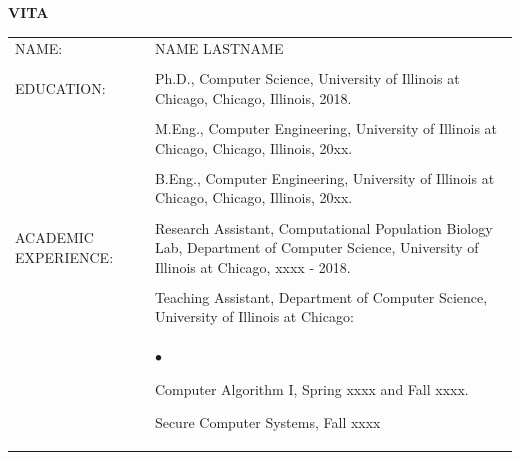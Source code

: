\documentclass{uicthesi}
\newcommand{\squishlist}{
   \begin{list}{$\bullet$}
    { \setlength{\itemsep}{-.1ex}      \setlength{\parsep}{0ex}
      \setlength{\topsep}{0ex}       \setlength{\partopsep}{0ex}
      \setlength{\leftmargin}{.8em} \setlength{\labelwidth}{1em}
      \setlength{\labelsep}{0.5em} } }
\newcommand{\squishend}{\end{list}}
\begin{document}
%
%
%
%
%
%
%
%
%
%

\bibformb

\newpage
\clearpage
    \pagestyle{pageontop}
   \thispagestyle{pageonbottom}
   \begin{large}
   \begin{center}
   {\bfseries VITA}
   \end{center}
   \end{large}
\begin{tabular}{p{2.8cm}p{10.5cm}}
NAME: & NAME LASTNAME  \\ 
    &\\
EDUCATION:  &Ph.D., Computer Science, University of Illinois at Chicago, Chicago, Illinois, 2018. \\  
            &\\
            &M.Eng., Computer Engineering, University of Illinois at Chicago, Chicago, Illinois, 20xx.\\
            &\\
            &B.Eng., Computer Engineering, University of Illinois at Chicago, Chicago, Illinois, 20xx.  \\
            &\\
ACADEMIC EXPERIENCE:  &Research Assistant, Computational Population Biology Lab, Department of Computer Science, University of Illinois at Chicago, xxxx - 2018. \\
            &\\
            &Teaching Assistant, Department of Computer Science, University of Illinois at Chicago: \\
            &\squishlist            
            \item Computer Algorithm I, Spring xxxx and  Fall xxxx.    
            \item Secure Computer Systems, Fall xxxx 
            \squishend \\
            

 \end{tabular}
\end{document}
